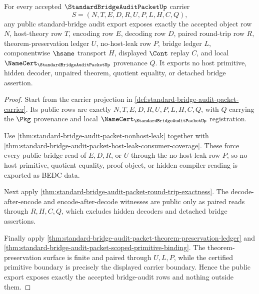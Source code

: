 \begin{theorem}
\label{thm:standard-bridge-audit-packet-public-bridge-audit-export}
For every accepted $\StandardBridgeAuditPacketUp$ carrier
$$
S=(N,T,E,D,R,U,P,L,H,C,Q),
$$
any public standard-bridge audit export exposes exactly the accepted object row $N$, host-theory row $T$, encoding row $E$, decoding row $D$, paired round-trip row $R$, theorem-preservation ledger $U$, no-host-leak row $P$, bridge ledger $L$, componentwise $\hsame$ transport $H$, displayed $\Cont$ replay $C$, and local $\NameCert_{\StandardBridgeAuditPacketUp}$ provenance $Q$. It exports no host primitive, hidden decoder, unpaired theorem, quotient equality, or detached bridge assertion.
\end{theorem}
\begin{proof}
Start from the carrier projection in \autoref{def:standard-bridge-audit-packet-carrier}. Its public rows are exactly $N,T,E,D,R,U,P,L,H,C,Q$, with $Q$ carrying the $\Pkg$ provenance and local $\NameCert_{\StandardBridgeAuditPacketUp}$ registration.

Use \autoref{thm:standard-bridge-audit-packet-nonhost-leak} together with \autoref{thm:standard-bridge-audit-packet-host-leak-consumer-coverage}. These force every public bridge read of $E,D,R$, or $U$ through the no-host-leak row $P$, so no host primitive, quotient equality, proof object, or hidden compiler reading is exported as BEDC data.

Next apply \autoref{thm:standard-bridge-audit-packet-round-trip-exactness}. The decode-after-encode and encode-after-decode witnesses are public only as paired reads through $R,H,C,Q$, which excludes hidden decoders and detached bridge assertions.

Finally apply \autoref{thm:standard-bridge-audit-packet-theorem-preservation-ledger} and \autoref{thm:standard-bridge-audit-packet-scoped-primitive-binding}. The theorem-preservation surface is finite and paired through $U,L,P$, while the certified primitive boundary is precisely the displayed carrier boundary. Hence the public export exposes exactly the accepted bridge-audit rows and nothing outside them.
\end{proof}

